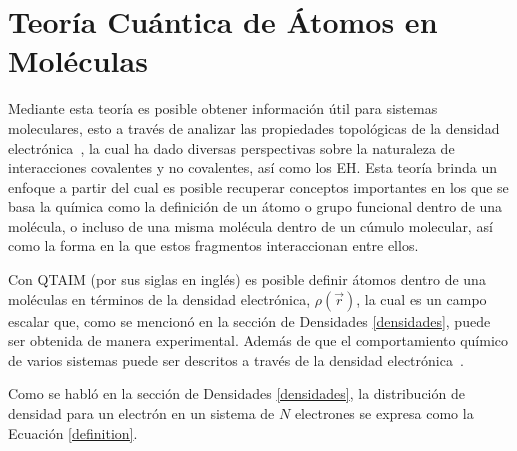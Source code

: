 \section{Teoría Cuántica de Átomos en Moléculas}

Mediante esta teoría es posible obtener información útil para sistemas
moleculares, esto a través de analizar las propiedades topológicas de la
densidad electrónica~\cite{bader}, la cual ha dado diversas perspectivas sobre
la naturaleza de interacciones covalentes y no covalentes, así como los EH.
Esta teoría brinda un enfoque a partir del cual es posible recuperar conceptos
importantes en los que se basa la química como la definición de un átomo o
grupo funcional dentro de una molécula, o incluso de una misma molécula dentro
de un cúmulo molecular, así como la forma en la que estos fragmentos
interaccionan entre ellos.

Con QTAIM (por sus siglas en inglés) es posible definir átomos dentro de una
moléculas en términos de la densidad electrónica, $\rho(\vec{r})$, la cual es
un campo escalar que, como se mencionó en la sección de Densidades
\ref{densidades}, puede ser obtenida de manera experimental. Además de que el
comportamiento químico de varios sistemas puede ser descritos a través de la
densidad electrónica~\cite{bader,matta}.

Como se habló en la sección de Densidades \ref{densidades}, la distribución de
densidad para un electrón en un sistema de $N$ electrones se expresa como la
Ecuación \ref{definition}.  

